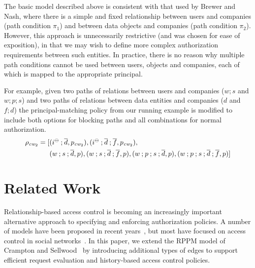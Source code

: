 \documentclass{article}
\newcommand{\comp}{\mathbin{;}}
\newcommand{\interestb}{\ensuremath{i^\ominus}}
\begin{document}
The basic model described above is consistent with that used by Brewer and Nash, where there is a simple and fixed relationship between users and companies (path condition $\pi_1$) and between data objects and companies (path condition $\pi_2$).
However, this approach is unnecessarily restrictive (and was chosen for ease of exposition), in that we may wish to define more complex authorization requirements between such entities.
In practice, there is no reason why multiple path conditions cannot be used between users, objects and companies, each of which is mapped to the appropriate principal.

For example, given two paths of relations between users and companies ($w \comp s$ and $w \comp p \comp s$) and two paths of relations between data entities and companies ($d$ and $f \comp d$) the principal-matching policy from our running example is modified to include both options for blocking paths and all combinations for normal authorization.
\begin{align*}
    \rho_{{\it cw}_2} = [&(\interestb \comp \overline{d}, p_{{\it cw}_2}), (\interestb \comp \overline{d} \comp \overline{f}, p_{{\it cw}_2}), \\
                                &(w \comp s \comp \overline{d}, p), (w \comp s \comp \overline{d} \comp \overline{f}, p), (w \comp p \comp s \comp \overline{d}, p), (w \comp p \comp s \comp \overline{d} \comp \overline{f}, p)]
\end{align*}


\section{Related Work}\label{sec:relatedwork}

Relationship-based access control is becoming an increasingly important alternative approach to specifying and enforcing authorization policies.
A number of models have been proposed in recent years~\cite{CarminatiFP09,ChengPS12passat,ChengPS12dbsec,CramptonS14,Fong11,ZhangAGC09}, but most have focused on access control in social networks~\cite{CarminatiFP09,ChengPS12passat,ChengPS12dbsec,Fong11,ZhangAGC09}.
In this paper, we extend the RPPM model of Crampton and Sellwood~\cite{CramptonS14} by introducing additional types of edges to support efficient request evaluation and history-based access control policies.
\end{document}
